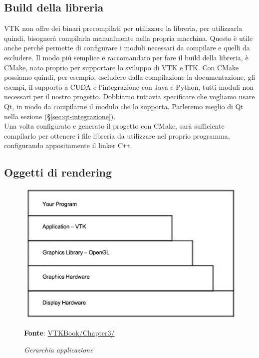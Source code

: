 \subsection{Build della libreria}\label{sec:build-liberia}
VTK non offre dei binari precompilati per utilizzare la libreria, per utilizzarla quindi, bisognerà compilarla manualmente nella propria macchina. Questo è utile anche perché permette di configurare i moduli necessari da compilare e quelli da escludere. Il modo più semplice e raccomandato per fare il build della libreria, è CMake, nato proprio per supportare lo sviluppo di VTK e ITK. Con CMake possiamo quindi, per esempio, escludere dalla compilazione la documentazione, gli esempi, il supporto a CUDA e l'integrazione con Java e Python, tutti moduli non necessari per il nostro progetto. Dobbiamo tuttavia specificare che vogliamo usare Qt, in modo da compilarne il modulo che lo supporta. Parleremo meglio di Qt nella sezione  (§\ref{sec:qt-integrazione}).\\
Una volta configurato e generato il progetto con CMake, sarà sufficiente compilarlo per ottenere i file libreria da utilizzare nel proprio programma, configurando appositamente il linker C\texttt{++}.

\subsection{Oggetti di rendering}\label{sec:oggetti-rendering}
\begin{figure}[h]
    \centering
    \includegraphics[scale=0.4]{immagini/volumerendering/layers.png}
    \caption{\textit{Gerarchia applicazione}}
    \textbf{Fonte}: \href{https://lorensen.github.io/VTKExamples/site/VTKBook/03Chapter3/}{VTKBook/Chapter3/}
    \label{fig: vtk-layers}
\end{figure}

